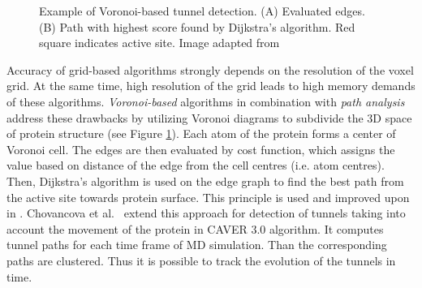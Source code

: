 \begin{figure}
\vspace{-37pt}
   \begin{center}
  \vspace{-5pt}
  \caption{Example of Voronoi-based tunnel detection. (A) Evaluated edges. (B) Path with highest score found by Dijkstra's algorithm. Red square indicates active site. Image adapted from~ \cite{caver20}}
  \label{Fig:voronoi} 
   \end{center} 
   \vspace{-20pt}
\end{figure} 
Accuracy of grid-based algorithms strongly depends on the resolution of the voxel grid. At the same time, high resolution of the grid leads to high memory demands of these algorithms. \textit{Voronoi-based} algorithms in combination with \textit{path analysis} address these drawbacks by utilizing Voronoi diagrams to subdivide the 3D space of protein structure (see Figure \ref{Fig:voronoi}). Each atom of the protein forms a center of Voronoi cell. The edges are then evaluated by cost function, which assigns the value based on distance of the edge from the cell centres (i.e. atom centres). Then, Dijkstra's algorithm is used on the edge graph to find the best path from the active site towards protein surface. This principle is used and improved upon in \cite{Petrek2007MOLE, caver20, Yaffe2008MolAxis}. Chovancova et al.~\cite{caver30} extend this approach for detection of tunnels taking into account the movement of the protein in CAVER 3.0 algorithm. It computes tunnel paths for each time frame of MD simulation. Than the corresponding paths are clustered. Thus it is possible to track the evolution of the tunnels in time.

